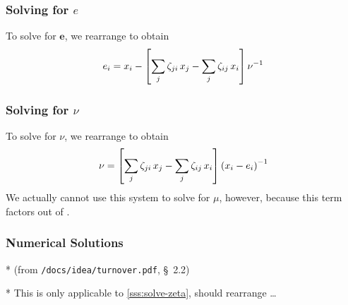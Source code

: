 \subsubsection{Solving for $e$}\label{sss:solve-e}
To solve for $\bm{e}$, we rearrange  to obtain
\begin{equation}\label{eq:system-e}
e_i = x_i - \left[ \sum_{j}{\zeta_{ji} \thinspace x_j}
- \sum_{j}{\zeta_{ij} \thinspace x_i} \right] \nu^{-1}
\end{equation}
\subsubsection{Solving for $\nu$}
To solve for $\nu$, we rearrange  to obtain
\begin{equation}\label{eq:system-nu}
  \nu = \left[ \sum_{j}{\zeta_{ji} \thinspace x_j}
             - \sum_{j}{\zeta_{ij} \thinspace x_i} \right]
       {\left( x_i - e_i \right)}^{-1}
\end{equation}
We actually cannot use this system to solve for $\mu$, however,
because this term factors out of .
\subsubsection{Numerical Solutions}
* (from \texttt{/docs/idea/turnover.pdf}, \S~2.2)
\par
* This is only applicable to \ref{sss:solve-zeta}, should rearrange \dots
